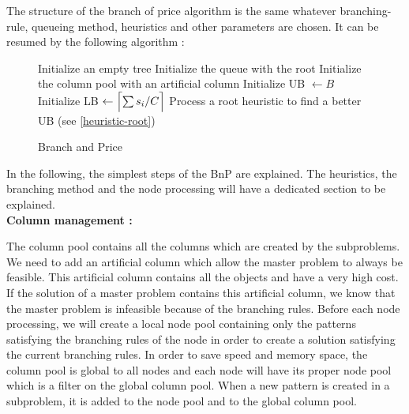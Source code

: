 The structure of the branch of price algorithm is the same whatever branching-rule, queueing method, heuristics and other parameters are chosen. It can be resumed by the following algorithm :

\begin{figure}[!ht]
	\centering
	\begin{minipage}{0.8\linewidth}
		\begin{algorithm}[H]
			\DontPrintSemicolon 
			\SetAlgoLined
			Initialize an empty tree\;
			Initialize the queue with the root\;
			Initialize the column pool with an artificial column\;
			Initialize UB $\leftarrow B$\;
			Initialize LB $\leftarrow \ceil[\Big]{\sum s_i/C}$\;
			Process a root heuristic to find a better UB (see \ref{heuristic-root})\;
			\caption{Branch and Price}
		\end{algorithm}
	\end{minipage}
\end{figure}
\noindent In the following, the simplest steps of the BnP are explained. The heuristics, the branching method and the node processing will have a dedicated section to be explained. \\

\noindent\textbf{Column management :}

The column pool contains all the columns which are created by the subproblems. We need to add an artificial column which allow the master problem to always be feasible. This artificial column contains all the objects and have a very high cost. If the solution of a master problem contains this artificial column, we know that the master problem is infeasible because of the branching rules. Before each node processing, we will create a local node pool containing only the patterns satisfying the branching rules of the node in order to create a solution satisfying the current branching rules. In order to save speed and memory space, the column pool is global to all nodes and each node will have its proper node pool which is a filter on the global column pool. When a new pattern is created in a subproblem, it is added to the node pool and to the global column pool.  \\

